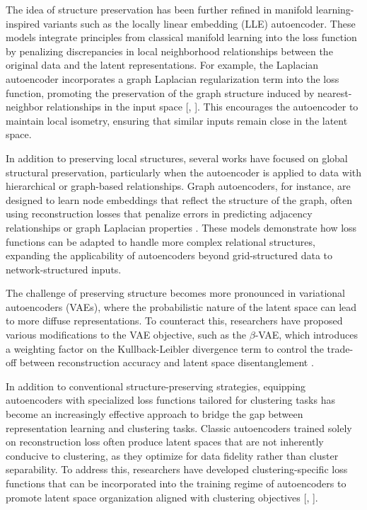 The idea of structure preservation has been further refined in manifold learning-inspired variants such as the locally linear embedding (LLE) autoencoder. These models integrate principles from classical manifold learning into the loss function by penalizing discrepancies in local neighborhood relationships between the original data and the latent representations. For example, the Laplacian autoencoder incorporates a graph Laplacian regularization term into the loss function, promoting the preservation of the graph structure induced by nearest-neighbor relationships in the input space [\cite{Miani22}, \cite{Wang14}]. This encourages the autoencoder to maintain local isometry, ensuring that similar inputs remain close in the latent space.

In addition to preserving local structures, several works have focused on global structural preservation, particularly when the autoencoder is applied to data with hierarchical or graph-based relationships. Graph autoencoders, for instance, are designed to learn node embeddings that reflect the structure of the graph, often using reconstruction losses that penalize errors in predicting adjacency relationships or graph Laplacian properties \cite{Kipf16}. These models demonstrate how loss functions can be adapted to handle more complex relational structures, expanding the applicability of autoencoders beyond grid-structured data to network-structured inputs.

The challenge of preserving structure becomes more pronounced in variational autoencoders (VAEs), where the probabilistic nature of the latent space can lead to more diffuse representations. To counteract this, researchers have proposed various modifications to the VAE objective, such as the $\beta$-VAE, which introduces a weighting factor on the Kullback-Leibler divergence term to control the trade-off between reconstruction accuracy and latent space disentanglement \cite{Burgess18}.

In addition to conventional structure-preserving strategies, equipping autoencoders with specialized loss functions tailored for clustering tasks has become an increasingly effective approach to bridge the gap between representation learning and clustering tasks. Classic autoencoders trained solely on reconstruction loss often produce latent spaces that are not inherently conducive to clustering, as they optimize for data fidelity rather than cluster separability. To address this, researchers have developed clustering-specific loss functions that can be incorporated into the training regime of autoencoders to promote latent space organization aligned with clustering objectives [\cite{Leiber25}, \cite{Beer24}].

